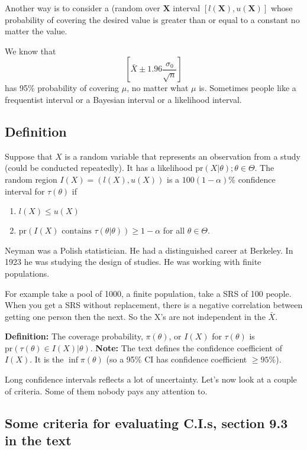 \documentclass[letterpaper, 12pt]{article}
\theoremstyle{definition}
\theoremstyle{plain}
\newcommand{\pr}{\text{pr}}
\begin{document}
Another way is to consider a (random over $\textbf{X}$ interval
$[l(\textbf{X}) , u(\textbf{X})]$ whose probability of covering the desired value is greater than or equal to a constant no matter the value.

We know that 
\begin{equation}
\left[
\bar{X} \pm 1.96 \frac{\sigma_0}{\sqrt{n}}
\right]
\end{equation}
has 95\% probability of covering $\mu$, no matter what $\mu$ is.
Sometimes people like a frequentist interval or a Bayesian interval or a likelihood interval.

\subsection{Definition}
Suppose that $X$ is a random variable that represents an observation from a study (could be conducted repeatedly). It has a likelihood $\pr(X | \theta); \theta \in \Theta$. The random region $I(X) = (l(X), u(X))$ is a $100(1- \alpha) \%$ confidence interval for $\tau(\theta)$ if 
\begin{enumerate}
\item
$l(X) \leq u(X)$
\item
$\pr(I(X) \text{ contains } \tau(\theta | \theta)) \geq 1 - \alpha$ for all $\theta \in \Theta$.
\end{enumerate}
Neyman was a Polish statistician. He had a distinguished career at Berkeley. In 1923 he was studying the design of studies. He was working with finite populations.

For example take a pool of 1000, a finite population, take a SRS of 100 people. When you get a SRS without replacement, there is a negative correlation between getting one person then the next. So the X's are not independent in the $\bar{X}$.

\textbf{Definition:} The coverage probability, $\pi(\theta)$, or $I(X)$ for $\tau(\theta)$ is $\pr(\tau(\theta) \in I(X) | \theta)$. \textbf{Note:} The text defines the confidence coefficient of $I(X)$. It is the $\inf \pi(\theta)$ (so a 95\% CI has confidence coefficient $\geq 95\%$).

Long confidence intervals reflects a lot of uncertainty. Let's now look at a couple of criteria. Some of them nobody pays any attention to.

\subsection{Some criteria for evaluating C.I.s, section 9.3 in the text} 
\end{document}
